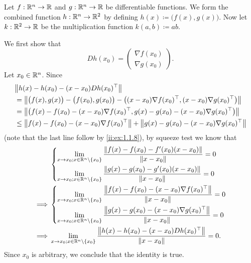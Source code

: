 \begin{eg}\label{ii:6.4.2}
  Let \(f : \R^n \to \R\) and \(g : \R^n \to \R\) be differentiable functions.
  We form the combined function \(h : \R^n \to \R^2\) by defining \(h(x) \coloneqq \big(f(x), g(x)\big)\).
  Now let \(k : \R^2 \to \R\) be the multiplication function \(k(a, b) \coloneqq ab\).

  We first show that
  \[
    D h(x_0) = \begin{pmatrix}
      \nabla f(x_0) \\
      \nabla g(x_0)
    \end{pmatrix}.
  \]
  Let \(x_0 \in \R^n\).
  Since
  \begin{align*}
     & \norm*{h(x) - h(x_0) - (x - x_0) D h(x_0)^\top}                                                                                  \\
     & = \norm*{\big(f(x), g(x)\big) - \big(f(x_0), g(x_0)\big) - \big((x - x_0) \nabla f(x_0)^\top, (x - x_0) \nabla g(x_0)^\top\big)} \\
     & = \norm*{\big(f(x) - f(x_0) - (x - x_0) \nabla f(x_0)^\top, g(x) - g(x_0) - (x - x_0) \nabla g(x_0)^\top\big)}                   \\
     & \leq \norm*{f(x) - f(x_0) - (x - x_0) \nabla f(x_0)^\top} + \norm*{g(x) - g(x_0) - (x - x_0) \nabla g(x_0)^\top}
  \end{align*}
  (note that the last line follow by \cref{ii:ex:1.1.8}),
  by squeeze test we know that
  \begin{align*}
             & \begin{dcases}
                 \lim_{x \to x_0 ; x \in \R^n \setminus \set{x_0}} \dfrac{\norm*{f(x) - f(x_0) - f'(x_0)(x - x_0)}}{\norm*{x - x_0}} = 0 \\
                 \lim_{x \to x_0 ; x \in \R^n \setminus \set{x_0}} \dfrac{\norm*{g(x) - g(x_0) - g'(x_0)(x - x_0)}}{\norm*{x - x_0}} = 0
               \end{dcases}       \\
    \implies & \begin{dcases}
                 \lim_{x \to x_0 ; x \in \R^n \setminus \set{x_0}} \dfrac{\norm*{f(x) - f(x_0) - (x - x_0) \nabla f(x_0)^\top}}{\norm*{x - x_0}} = 0 \\
                 \lim_{x \to x_0 ; x \in \R^n \setminus \set{x_0}} \dfrac{\norm*{g(x) - g(x_0) - (x - x_0) \nabla g(x_0)^\top}}{\norm*{x - x_0}} = 0
               \end{dcases}       \\
    \implies & \lim_{x \to x_0 ; x \in \R^n \setminus \set{x_0}} \dfrac{\norm*{h(x) - h(x_0) - (x - x_0) D h(x_0)^\top}}{\norm*{x - x_0}} = 0.
  \end{align*}
  Since \(x_0\) is arbitrary, we conclude that the identity is true.


\end{eg}
